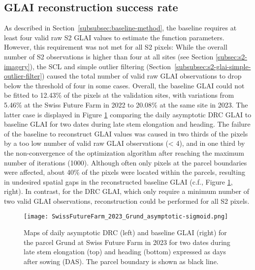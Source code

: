 \subsection{GLAI reconstruction success rate}
\label{subsec:glai-reconstruction-sucess}
As described in Section~\ref{subsubsec:baseline-method}, the baseline requires at least four valid raw \gls{S2} \gls{GLAI} values to estimate the function parameters. However, this requirement was not met for all \gls{S2} pixels: While the overall number of \gls{S2} observations is higher than four at all sites (see Section \ref{subsec:s2-imagery}), the \gls{SCL} and simple outlier filtering (Section~\ref{subsubsec:s2-glai-simple-outlier-filter}) caused the total number of valid raw \gls{GLAI} observations to drop below the threshold of four in some cases. Overall, the baseline \gls{GLAI} could not be fitted to 12.43\% of the pixels at the validation sites, with variations from 5.46\% at the Swiss Future Farm in 2022 to 20.08\% at the same site in 2023. The latter case is displayed in Figure \ref{fig:maps-baseline-failure} comparing the daily asymptotic \gls{DRC} \gls{GLAI} to baseline \gls{GLAI} for two dates during late stem elongation and heading. The failure of the baseline to reconstruct \gls{GLAI} values was caused in two thirds of the pixels by a too low number of valid raw \gls{GLAI} observations (< 4), and in one third by the non-convergence of the optimization algorithm after reaching the maximum number of iterations (1000). Although often only pixels at the parcel boundaries were affected, about 40\% of the pixels were located within the parcels, resulting in undesired spatial gaps in the reconstructed baseline \gls{GLAI} (c.f., Figure \ref{fig:maps-baseline-failure}, right). In contrast, for the \gls{DRC} \gls{GLAI}, which only require a minimum number of two valid \gls{GLAI} observations, reconstruction could be performed for all \gls{S2} pixels.

\begin{figure}[H]
    \centering
    \texttt{[image: SwissFutureFarm\_2023\_Grund\_asymptotic-sigmoid.png]}
    \caption{Maps of daily asymptotic DRC (left) and baseline GLAI (right) for the parcel Grund at Swiss Future Farm in 2023 for two dates during late stem elongation (top) and heading (bottom) expressed as days after sowing (DAS). The parcel boundary is shown as black line.}
    \label{fig:maps-baseline-failure}
\end{figure}